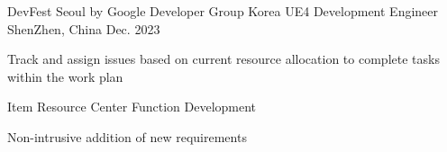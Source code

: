 

\begin{cventries}

  \cventry
    {DevFest Seoul by Google Developer Group Korea} %
    {UE4 Development Engineer} %
    {ShenZhen, China} %
    {Dec. 2023} %
    {
      \begin{cvitems} %
        \item {Track and assign issues based on current resource allocation to complete tasks within the work plan}
        \item {Item Resource Center Function Development}
        \item {Non-intrusive addition of new requirements}
      \end{cvitems}
    }

\end{cventries}
